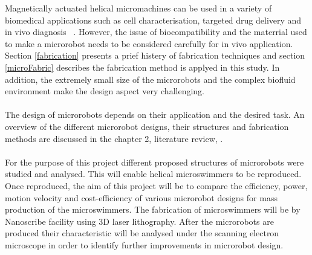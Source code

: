 \documentclass[12pt,a4paper,titlepage]{report}
\begin{document}
Magnetically actuated helical micromachines can be used
 in a variety of biomedical applications such as cell characterisation, targeted drug delivery and in vivo 
diagnosis ~\citep{peyer2013magnetic}. However, the issue of biocompatibility and the materrial 
used to make a microrobot needs to be considered carefully for in vivo application\citep{qiu2014noncytotoxic}. 
Section \ref{fabrication} presents a prief histery of fabrication techniques and section \ref{microFabric} describes
 the fabrication method is applyed in this study.     
In addition, the extremely small size of the microrobots and the
complex biofluid environment make the design aspect very challenging. 


\paragraph{}
The design of microrobots depends on their application and the desired task. An overview of the different
 microrobot designs, their structures and fabrication methods are discussed in the chapter 2, literature review, .

\paragraph{}
For the purpose of this project different proposed structures of microrobots were studied
 and analysed. This will enable helical microswimmers to be reproduced. Once reproduced, the aim of this project will be to compare
 the efficiency, power, motion velocity and cost-efficiency of various microrobot designs for mass production
 of the microswimmers. The fabrication of microswimmers will be by Nanoscribe facility using 3D laser
 lithography. After the microrobots are produced their characteristic will be analysed
 under the scanning electron microscope in order to identify further improvements in microrobot design. 
\end{document}
